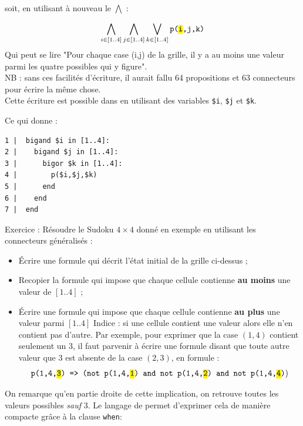 soit, en utilisant à nouveau le $\bigwedge$ :

\[\bigwedge_{i\in [1..4]}\bigwedge_{j\in [1..4]}\bigvee_{k\in [1..4]} \texttt{p(\hl{i},j,k)}\]
Qui peut se lire "Pour chaque case (i,j) de la grille, il y a au moins une valeur parmi les quatre possibles qui y figure". \\

\noindent NB : sans ces facilités d'écriture, il aurait fallu 64 propositions et 63 connecteurs pour écrire la même chose. \\

Cette écriture est possible dans \touist en utilisant des variables \texttt{\$i}, \texttt{\$j} et \texttt{\$k}.

Ce qui donne : 
\begin{verbatim}
1 |  bigand $i in [1..4]:
2 |    bigand $j in [1..4]:
3 |      bigor $k in [1..4]:
4 |        p($i,$j,$k)
5 |      end
6 |    end
7 |  end
\end{verbatim}


Exercice : Résoudre le Sudoku $4\times 4$ donné en exemple en utilisant les connecteurs généralisés :
\begin{itemize}
	\item Écrire une formule qui décrit l'état initial de la grille ci-dessus ;
    \item Recopier la formule qui impose que chaque cellule contienne \textbf{au moins} une valeur de $[1..4]$ ;
	\item Écrire une formule qui impose que chaque cellule contienne \textbf{au plus} une valeur parmi $[1..4]$ 
Indice : si une cellule contient une valeur alors elle n'en contient pas d'autre. Par exemple, pour exprimer que la case $(1,4)$ contient seulement un 3, il faut parvenir à écrire une formule disant que toute autre valeur que 3 est absente de la case $(2,3)$, en formule : 
\[\texttt{p(1,4,\hl{3}) => (not p(1,4,\hl{1}) and not p(1,4,\hl{2}) and not p(1,4,\hl{4})})\]
\end{itemize}
On remarque qu'en partie droite de cette implication, on retrouve toutes les valeurs possibles \emph{sauf} 3. Le langage de \touist permet d'exprimer cela de manière compacte grâce à la clause \texttt{when}: 

